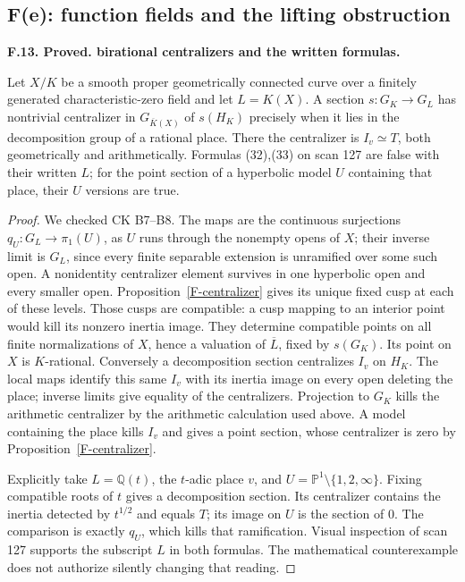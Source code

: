\documentclass[11pt,oneside]{article}
\makeatletter
\newcounter{statementanchor}
\newenvironment{statement}[3]{%
 \refstepcounter{statementanchor}\def\@currentlabel{#1}%
 \par\addvspace{9pt}\noindent
 \textbf{#1. #2. #3.}\par\nobreak\noindent\ignorespaces
}{\par\addvspace{5pt}}
\makeatother
\begin{document}
\subsection{F(e): function fields and the lifting obstruction}

\begin{statement}{F.13}{Proved}{birational centralizers and the written formulas}
\label{st:F.13}
\label{F-birational}
Let $X/K$ be a smooth proper geometrically connected curve over a
finitely generated characteristic-zero field and let $L=K(X)$.
A section $s:G_K\to G_L$ has nontrivial centralizer in
$G_{\overline K(X)}$ of $s(H_K)$ precisely when it lies in the
decomposition group of a rational place. There the centralizer is
$I_v\simeq T$, both geometrically and arithmetically. Formulas
(32),(33) on scan 127 are false with their written $L$; for the
point section of a hyperbolic model $U$ containing that place,
their $U$ versions are true.
\end{statement}
\begin{proof}
We checked CK B7--B8. The maps are the continuous surjections
$q_U:G_L\to\pi_1(U)$, as $U$ runs through the nonempty opens of
$X$; their inverse limit is $G_L$, since every finite separable
extension is unramified over some such open. A nonidentity
centralizer element survives in one hyperbolic open and every
smaller open. Proposition~\ref{F-centralizer} gives its unique
fixed cusp at each of these levels. Those cusps are compatible:
a cusp mapping to an interior point would kill its nonzero
inertia image. They determine compatible points on all finite
normalizations of $X$, hence a valuation of $\overline L$, fixed
by $s(G_K)$. Its point on $X$ is $K$-rational. Conversely a
decomposition section centralizes $I_v$ on $H_K$. The local
maps identify this same $I_v$ with its inertia image on every
open deleting the place; inverse limits give equality of the
centralizers. Projection to $G_K$ kills the arithmetic centralizer
by the arithmetic calculation used above. A model containing the
place kills $I_v$ and gives a point section, whose centralizer is
zero by Proposition~\ref{F-centralizer}.

Explicitly take $L=\mathbb Q(t)$, the $t$-adic place $v$, and
$U=\mathbb P^1\setminus\{1,2,\infty\}$. Fixing compatible roots
of $t$ gives a decomposition section. Its centralizer contains the
inertia detected by $t^{1/2}$ and equals $T$; its image on $U$ is
the section of $0$. The comparison is exactly $q_U$, which kills
that ramification. Visual inspection of scan 127 supports the
subscript $L$ in both formulas. The mathematical counterexample
does not authorize silently changing that reading.
\end{proof}
\end{document}
